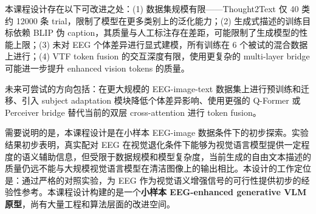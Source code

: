 本课程设计存在以下可改进之处：(1) 数据集规模有限——Thought2Text 仅 40 类约 12000 条 trial，限制了模型在更多类别上的泛化能力；(2) 生成式描述的训练目标依赖 BLIP 伪 caption，其质量与人工标注存在差距，可能限制了生成模型的性能上限；(3) 未对 EEG 个体差异进行显式建模，所有训练在 6 个被试的混合数据上进行；(4) VTF token fusion 的交互深度有限，使用更复杂的 multi-layer bridge 可能进一步提升 enhanced vision tokens 的质量。

未来可尝试的方向包括：在更大规模的 EEG-image-text 数据集上进行预训练和迁移、引入 subject adaptation 模块降低个体差异影响、使用更强的 Q-Former 或 Perceiver bridge 替代当前的双层 cross-attention 进行 token fusion。

需要说明的是，本课程设计是在小样本 EEG-image 数据条件下的初步探索。实验结果初步表明，真实配对 EEG 在视觉退化条件下能够为视觉语言模型提供一定程度的语义辅助信息，但受限于数据规模和模型复杂度，当前生成的自由文本描述的质量仍远不能与大规模视觉语言模型在清洁图像上的输出相比。本设计的工作定位是：通过严格的对照实验，为 EEG 作为视觉语义增强信号的可行性提供初步的经验性参考。本课程设计构建的是一个\textbf{小样本 EEG-enhanced generative VLM 原型}，尚有大量工程和算法层面的改进空间。

